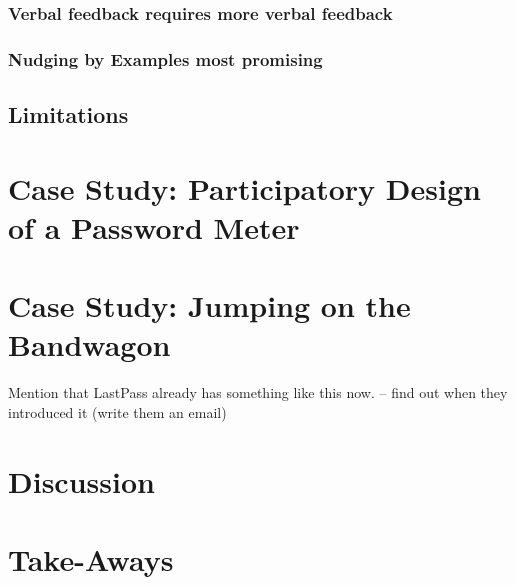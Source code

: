 \subsubsection{Verbal feedback requires more verbal feedback}
\subsubsection{Nudging by Examples most promising}


\subsection{Limitations}


\section{Case Study: Participatory Design of a Password Meter}

\section{Case Study: Jumping on the Bandwagon}
Mention that LastPass already has something like this now. -- find out when they introduced it (write them an email) 

\section{Discussion}


\section{Take-Aways}
